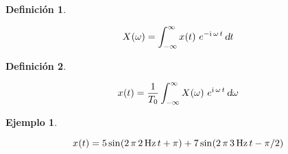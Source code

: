 \documentclass[a5paper,12pt,twoside]{book}
\newtheorem{defn}{{Definición}}[chapter]
\newtheorem{example}{{Ejemplo}}[chapter]
\begin{document}

\begin{mdframed}[style=MyFrame1]
    \begin{defn}
        \label{defn:FourierTrans}
    \end{defn}
    \begin{equation*}
        \fx[X]{\omega} = \int_{-\infty}^\infty \fx[x]{t} \, e^{-\iu \, \omega \, t} \, \dif t
    \end{equation*}
\end{mdframed}

\begin{mdframed}[style=MyFrame1]
    \begin{defn}
        \label{defn:FourierTrans}
    \end{defn}
    \begin{equation*}
        \fx[x]{t} = \frac{1}{T_0} \int_{-\infty}^\infty \fx[X]{\omega} \, e^{\iu \, \omega \, t} \, \dif \omega
    \end{equation*}
\end{mdframed}

\begin{mdframed}[style=MyFrame2]
    \begin{example}
    \end{example}
    \begin{equation*}
        \fx[x]{t} = 5 \fx[\sin]{2 \, \pi \, \SI{2}{\hertz} \, t + \pi} + 7 \fx[\sin]{2 \, \pi \, \SI{3}{\hertz} \, t - \pi/2}
    \end{equation*}
    
\end{mdframed}
\end{document}
